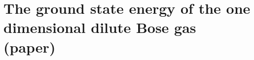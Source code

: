 \chapter{The ground state energy of the one dimensional dilute Bose gas (paper)}
\label{ChapterTheGroundStateEnergyOfTheOneDimensionalDiluteBoseGas}


